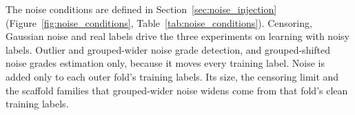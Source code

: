 
The noise conditions are defined in Section~\ref{sec:noise_injection} (Figure~\ref{fig:noise_conditions}, Table~\ref{tab:noise_conditions}). Censoring, Gaussian noise and real labels drive the three experiments on learning with noisy labels. Outlier and grouped-wider noise grade detection, and grouped-shifted noise grades estimation only, because it moves every training label. Noise is added only to each outer fold's training labels. Its size, the censoring limit and the scaffold families that grouped-wider noise widens come from that fold's clean training labels.

